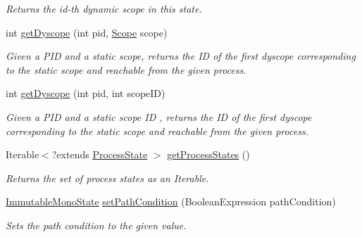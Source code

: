 \begin{DoxyCompactItemize}
\begin{DoxyCompactList}\small\item\em Returns the id-\/th dynamic scope in this state. \end{DoxyCompactList}\item 
int \hyperlink{classedu_1_1udel_1_1cis_1_1vsl_1_1civl_1_1state_1_1common_1_1immutable_1_1ImmutableMonoState_a0474dd81df5571cf02b55bf56de1d3ae}{get\+Dyscope} (int pid, \hyperlink{interfaceedu_1_1udel_1_1cis_1_1vsl_1_1civl_1_1model_1_1IF_1_1Scope}{Scope} scope)
\begin{DoxyCompactList}\small\item\em Given a P\+I\+D and a static scope, returns the I\+D of the first dyscope corresponding to the static scope and reachable from the given process. \end{DoxyCompactList}\item 
int \hyperlink{classedu_1_1udel_1_1cis_1_1vsl_1_1civl_1_1state_1_1common_1_1immutable_1_1ImmutableMonoState_a5e63c853c0ae6980bc2bae95fc860d93}{get\+Dyscope} (int pid, int scope\+I\+D)
\begin{DoxyCompactList}\small\item\em Given a P\+I\+D and a static scope I\+D , returns the I\+D of the first dyscope corresponding to the static scope and reachable from the given process. \end{DoxyCompactList}\item 
Iterable$<$?extends \hyperlink{interfaceedu_1_1udel_1_1cis_1_1vsl_1_1civl_1_1state_1_1IF_1_1ProcessState}{Process\+State} $>$ \hyperlink{classedu_1_1udel_1_1cis_1_1vsl_1_1civl_1_1state_1_1common_1_1immutable_1_1ImmutableMonoState_a43c23e116de70f1afe5de88ac5b96caa}{get\+Process\+States} ()
\begin{DoxyCompactList}\small\item\em Returns the set of process states as an {\ttfamily Iterable}. \end{DoxyCompactList}\item 
\hyperlink{classedu_1_1udel_1_1cis_1_1vsl_1_1civl_1_1state_1_1common_1_1immutable_1_1ImmutableMonoState}{Immutable\+Mono\+State} \hyperlink{classedu_1_1udel_1_1cis_1_1vsl_1_1civl_1_1state_1_1common_1_1immutable_1_1ImmutableMonoState_ac10cd50dfa69d112dbeb68480fdd98be}{set\+Path\+Condition} (Boolean\+Expression path\+Condition)
\begin{DoxyCompactList}\small\item\em Sets the path condition to the given value. \end{DoxyCompactList}\item 

\end{DoxyCompactItemize}
